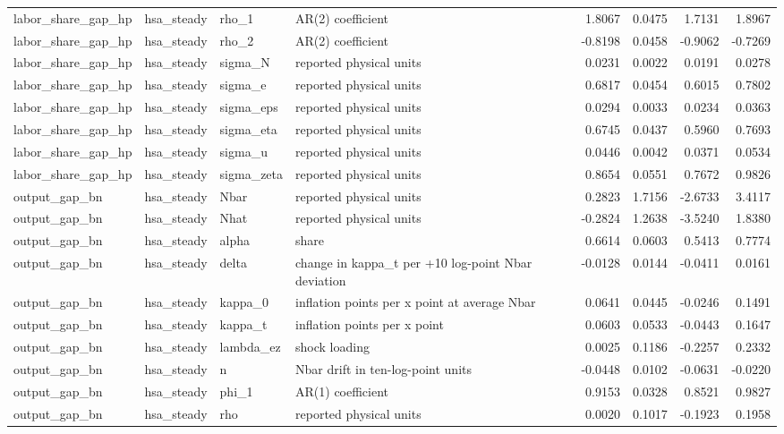 \begin{tabular}{llllrrrr}
labor\_share\_gap\_hp & hsa\_steady & rho\_1 & AR(2) coefficient & 1.8067 & 0.0475 & 1.7131 & 1.8967 \\
labor\_share\_gap\_hp & hsa\_steady & rho\_2 & AR(2) coefficient & -0.8198 & 0.0458 & -0.9062 & -0.7269 \\
labor\_share\_gap\_hp & hsa\_steady & sigma\_N & reported physical units & 0.0231 & 0.0022 & 0.0191 & 0.0278 \\
labor\_share\_gap\_hp & hsa\_steady & sigma\_e & reported physical units & 0.6817 & 0.0454 & 0.6015 & 0.7802 \\
labor\_share\_gap\_hp & hsa\_steady & sigma\_eps & reported physical units & 0.0294 & 0.0033 & 0.0234 & 0.0363 \\
labor\_share\_gap\_hp & hsa\_steady & sigma\_eta & reported physical units & 0.6745 & 0.0437 & 0.5960 & 0.7693 \\
labor\_share\_gap\_hp & hsa\_steady & sigma\_u & reported physical units & 0.0446 & 0.0042 & 0.0371 & 0.0534 \\
labor\_share\_gap\_hp & hsa\_steady & sigma\_zeta & reported physical units & 0.8654 & 0.0551 & 0.7672 & 0.9826 \\
output\_gap\_bn & hsa\_steady & Nbar & reported physical units & 0.2823 & 1.7156 & -2.6733 & 3.4117 \\
output\_gap\_bn & hsa\_steady & Nhat & reported physical units & -0.2824 & 1.2638 & -3.5240 & 1.8380 \\
output\_gap\_bn & hsa\_steady & alpha & share & 0.6614 & 0.0603 & 0.5413 & 0.7774 \\
output\_gap\_bn & hsa\_steady & delta & change in kappa\_t per +10 log-point Nbar deviation & -0.0128 & 0.0144 & -0.0411 & 0.0161 \\
output\_gap\_bn & hsa\_steady & kappa\_0 & inflation points per x point at average Nbar & 0.0641 & 0.0445 & -0.0246 & 0.1491 \\
output\_gap\_bn & hsa\_steady & kappa\_t & inflation points per x point & 0.0603 & 0.0533 & -0.0443 & 0.1647 \\
output\_gap\_bn & hsa\_steady & lambda\_ez & shock loading & 0.0025 & 0.1186 & -0.2257 & 0.2332 \\
output\_gap\_bn & hsa\_steady & n & Nbar drift in ten-log-point units & -0.0448 & 0.0102 & -0.0631 & -0.0220 \\
output\_gap\_bn & hsa\_steady & phi\_1 & AR(1) coefficient & 0.9153 & 0.0328 & 0.8521 & 0.9827 \\
output\_gap\_bn & hsa\_steady & rho & reported physical units & 0.0020 & 0.1017 & -0.1923 & 0.1958 \\

\end{tabular}
